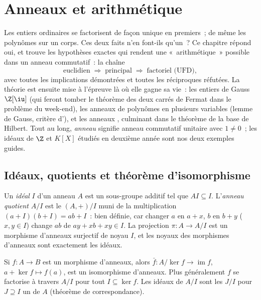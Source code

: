\chapter{Anneaux et arithmétique}\label{ch:b3:rings}

Les entiers ordinaires se factorisent de façon unique en
premiers~; de même les polynômes sur un corps. Ces deux faits
n'en font-ils qu'un~? Ce chapitre répond oui, et trouve les
hypothèses exactes qui rendent une «~arithmétique~» possible dans
un anneau commutatif~: la chaîne
\[
\text{euclidien} \;\Longrightarrow\; \text{principal}
\;\Longrightarrow\; \text{factoriel (UFD)},
\]
avec toutes les implications démontrées et toutes les
réciproques réfutées. La théorie est ensuite mise à l'épreuve
là où elle gagne sa vie~: les entiers de Gauss $\Z[\iu]$ (qui
feront tomber le théorème des deux carrés de Fermat dans le problème
du week-end), les anneaux de polynômes en plusieurs variables
(lemme de Gauss, critère d'), et les anneaux
, culminant dans le théorème de la base de Hilbert.
Tout au long, \emph{anneau} signifie anneau commutatif unitaire
avec $1 \neq 0$~; les idéaux de $\Z$ et $K[X]$ étudiés en
deuxième année sont nos deux exemples guides.

\section{Idéaux, quotients et théorème d'isomorphisme}

\begin{definition}\label{def:b3:rings:ideal}
Un \emph{idéal} $I$ d'un anneau $A$ est un
sous-groupe additif tel que $AI \subseteq I$. L'\emph{anneau
quotient} $A/I$ est le 
$(A, +)/I$ muni de la multiplication $(a + I)(b + I) = ab + I$~:
bien définie, car changer $a$ en $a + x$, $b$ en $b + y$ ($x, y
\in I$) change $ab$ de $ay + xb + xy \in I$. La projection $\pi
\colon A \to A/I$ est un morphisme d'anneaux surjectif de noyau
$I$, et les noyaux des morphismes d'anneaux sont exactement les
idéaux.
\end{definition}

\begin{theorem}\label{thm:b3:rings:firstiso}
Si $f \colon A \to B$ est un morphisme d'anneaux, alors $\bar
f\colon A/\ker f \to \operatorname{im} f$, $a + \ker f \mapsto
f(a)$, est un isomorphisme d'anneaux. Plus généralement $f$ se
factorise à travers $A/I$ pour tout  $I \subseteq \ker f$.
Les idéaux de $A/I$ sont les $J/I$ pour $J \supseteq I$ un 
de $A$ (théorème de correspondance).
\end{theorem}

